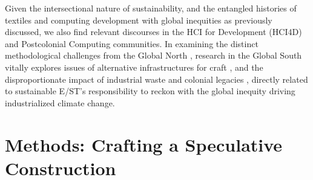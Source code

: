 \documentclass[manuscript,review,anonymous]{acmart}
\begin{document}




Given the intersectional nature of sustainability, and the entangled histories of textiles and computing development with global inequities as previously discussed, we also find relevant discourses in the HCI for Development (HCI4D) and Postcolonial Computing communities. In examining the distinct methodological challenges from the Global North \cite{chetty_hci4d_2007}, research in the Global South vitally explores issues of alternative infrastructures for craft \cite{jack_infrastructure_2017, zhang_designing_2019}, and the disproportionate impact of industrial waste \cite{rifat_breaking_2019} and colonial legacies \cite{philip_postcolonial_2012, irani_postcolonial_2010}, directly related to sustainable E/ST's responsibility to reckon with the global inequity driving industrialized climate change.

\section{Methods: Crafting a Speculative Construction}
\end{document}
